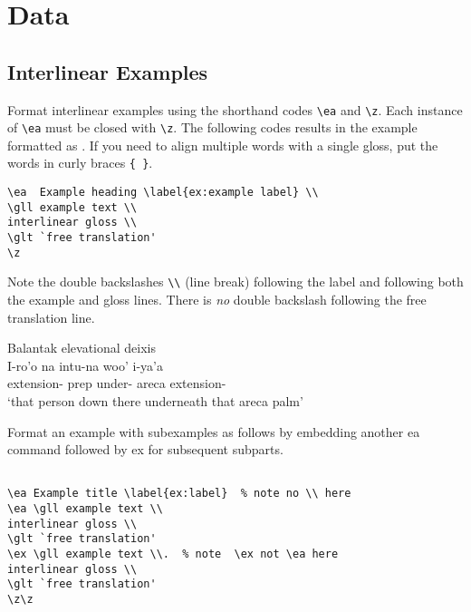 \chapter{Data}\label{chap:data}

\section{Interlinear Examples}\label{sec:interlinear}
Format interlinear examples using the shorthand codes \verb|\ea|  and \verb|\z|. Each instance of  \verb|\ea| must be closed with \verb|\z|. The following codes results in the example formatted as . If you need to align multiple words with a single gloss, put the words in curly braces \verb|{ }|. 

{\small 
\begin{lstlisting} 
\ea  Example heading \label{ex:example label} \\
\gll example text \\
interlinear gloss \\
\glt `free translation' 
\z
\end{lstlisting}
}

\noindent
Note the double backslashes \verb|\\| (line break) following the label and following both the example and gloss  lines. There is \textit{no} double backslash following the free translation line.

\ea  Balantak elevational deixis \citep[134]{busenitz1992}\label{ex:balantak}\\
\gll I-ro'o na intu-na woo' i-ya'a \\
{extension-\low} prep under- areca extension- \\
\glt `that person down there underneath that areca palm' 
\z

\noindent
Format an example with subexamples as follows by embedding another ea command followed by ex for subsequent subparts. 

{\small \begin{lstlisting}

\ea Example title \label{ex:label}  % note no \\ here
\ea \gll example text \\
interlinear gloss \\
\glt `free translation' 
\ex \gll example text \\.  % note  \ex not \ea here
interlinear gloss \\
\glt `free translation' 
\z\z
\end{lstlisting} }


